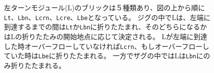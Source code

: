 \documentclass[a4,11pt]{article}
\begin{document}


%
%
\begin{figure}[p]
  \centering
 \caption{左ターンモジュール(L)のブリックは５種類あり、図の上から順に\texttt{Lt}、\texttt{Lbn}、\texttt{Lcrn}、\texttt{Lcre}、\texttt{Lbe}となっている。
ジグの中でLは、左端に到達するまでの間は\texttt{Lt}か\texttt{Lbn}に折りたたまれ、そのどちらになるかはLの折りたたみの開始地点に応じて決定される。
Lが左端に到達した時オーバーフローしていなければ\texttt{Lcrn}、もしオーバーフローしていた時は\texttt{Lbe}に折りたたまれる。
一方でザグの中ではLは\texttt{Lbn}にのみ折りたたまれる。}
 \label{fig:leftturns}
\end{figure}
\end{document}
